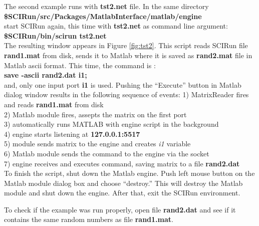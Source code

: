 \documentclass[12pt]{IEEEtran}
\newcommand{\sr}{SCIRun}
\begin{document}
The second example runs with {\bf tst2.net} file. In the same
directory \\
{\bf \$SCIRun/src/Packages/MatlabInterface/matlab/engine } \\
start SCIRun again, this time with {\bf tst2.net} as command line argument: \\
{\bf \$SCIRun/bin/scirun  tst2.net} \\
The resulting window appears in Figure \ref{fig:tst2}. This
script reads \sr{} file {\bf rand1.mat} from disk, sends
it to Matlab where it is saved as {\bf rand2.mat} file
in Matlab ascii format. This time, the command is : \\
{\bf save -ascii rand2.dat i1;} \\
and, only one input port {\bf i1} is used. Pushing the
``Execute'' button in Matlab dialog window results in
the following sequence of events:
1) MatrixReader fires and reads {\bf rand1.mat} from disk \\
2) Matlab module fires, assepts the matrix on the first port \\
3) automatically runs MATLAB with engine script in the background  \\
4) engine starts listening at {\bf 127.0.0.1:5517} \\
5) module sends matrix to the engine and creates {\it i1} variable\\
6) Matlab module sends the command to the engine via the socket\\
7) engine receives and executes command, saving matrix to a file {\bf rand2.dat} \\

To finish the script, shut down the Matlab engine.
Push left mouse button on the
Matlab module dialog box and choose ``destroy.'' This will destroy
the Matlab module and shut down the engine. After that, exit
the \sr{} environment.

To check if the example was run properly, open file {\bf rand2.dat}
and see if it contains the same random numbers as file {\bf rand1.mat}.
\end{document}
